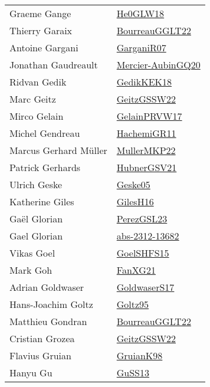{\begin{longtable}{p{4cm}p{20cm}}
Graeme Gange & \href{papers/He0GLW18.pdf}{He0GLW18}\cite{He0GLW18} \\
Thierry Garaix & \href{articles/BourreauGGLT22.pdf}{BourreauGGLT22}\cite{BourreauGGLT22} \\
Antoine Gargani & \href{papers/GarganiR07.pdf}{GarganiR07}\cite{GarganiR07} \\
Jonathan Gaudreault & \href{papers/Mercier-AubinGQ20.pdf}{Mercier-AubinGQ20}\cite{Mercier-AubinGQ20} \\
Ridvan Gedik & \href{articles/GedikKEK18.pdf}{GedikKEK18}\cite{GedikKEK18} \\
Marc Geitz & \href{papers/GeitzGSSW22.pdf}{GeitzGSSW22}\cite{GeitzGSSW22} \\
Mirco Gelain & \href{papers/GelainPRVW17.pdf}{GelainPRVW17}\cite{GelainPRVW17} \\
Michel Gendreau & \href{articles/HachemiGR11.pdf}{HachemiGR11}\cite{HachemiGR11} \\
Marcus Gerhard M{\"{u}}ller & \href{articles/MullerMKP22.pdf}{MullerMKP22}\cite{MullerMKP22} \\
Patrick Gerhards & \href{articles/HubnerGSV21.pdf}{HubnerGSV21}\cite{HubnerGSV21} \\
Ulrich Geske & \href{papers/Geske05.pdf}{Geske05}\cite{Geske05} \\
Katherine Giles & \href{papers/GilesH16.pdf}{GilesH16}\cite{GilesH16} \\
Ga{\"{e}}l Glorian & \href{papers/PerezGSL23.pdf}{PerezGSL23}\cite{PerezGSL23} \\
Gael Glorian & \href{articles/abs-2312-13682.pdf}{abs-2312-13682}\cite{abs-2312-13682} \\
Vikas Goel & \href{articles/GoelSHFS15.pdf}{GoelSHFS15}\cite{GoelSHFS15} \\
Mark Goh & \href{articles/FanXG21.pdf}{FanXG21}\cite{FanXG21} \\
Adrian Goldwaser & \href{papers/GoldwaserS17.pdf}{GoldwaserS17}\cite{GoldwaserS17} \\
Hans{-}Joachim Goltz & \href{papers/Goltz95.pdf}{Goltz95}\cite{Goltz95} \\
Matthieu Gondran & \href{articles/BourreauGGLT22.pdf}{BourreauGGLT22}\cite{BourreauGGLT22} \\
Cristian Grozea & \href{papers/GeitzGSSW22.pdf}{GeitzGSSW22}\cite{GeitzGSSW22} \\
Flavius Gruian & \href{papers/GruianK98.pdf}{GruianK98}\cite{GruianK98} \\
Hanyu Gu & \href{papers/GuSS13.pdf}{GuSS13}\cite{GuSS13} \\

\end{longtable}}
